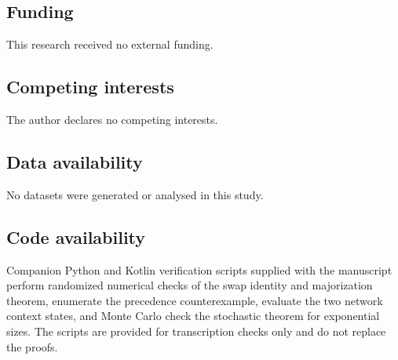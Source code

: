 \documentclass[pdflatex,iicol,sn-basic]{sn-jnl}
\theoremstyle{thmstyleone}
\theoremstyle{thmstyletwo}
\theoremstyle{thmstylethree}
\begin{document}
\subsection*{Funding}
This research received no external funding.

\subsection*{Competing interests}
The author declares no competing interests.

\subsection*{Data availability}
No datasets were generated or analysed in this study.

\subsection*{Code availability}
Companion Python and Kotlin verification scripts supplied with the manuscript
perform randomized numerical checks of the swap identity and majorization
theorem, enumerate the precedence counterexample, evaluate the two network
context states, and Monte Carlo check the stochastic theorem for exponential
sizes. The scripts are provided for transcription checks only and do not
replace the proofs.
\end{document}
